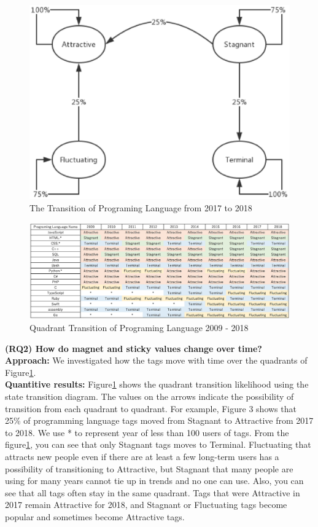 \documentclass[conference]{IEEEtran}
\begin{document}
\begin{figure}[t]
 \centering
 \includegraphics[width=.9\hsize]{img/Lang2017.eps}  
 \caption{The Transition of Programing Language from 2017 to 2018} 
 \label{fig:langtrans2018} 
\end{figure}

\begin{figure}[t]
 \centering
 \includegraphics[width=.9\hsize]{img/LanguageASFT.eps}  
 \caption{Quadrant Transition of Programing Language 2009 - 2018} 
 \label{fig:LangQuadrant} 
\end{figure}


\textbf{(RQ2) How do magnet and sticky values change over time?} \\
\smallskip\smallskip
\textbf{Approach:}
We investigated how the tags move with time over the quadrants of Figure\ref{fig:langtrans2018}. \\
\textbf{Quantitive results:}
Figure\ref{fig:langtrans2018} shows the quadrant transition likelihood using the state transition diagram. The values ​​on the arrows indicate the possibility of transition from each quadrant to quadrant. For example, Figure 3 shows that 25\% of programming language tags moved from Stagnant to Attractive from 2017 to 2018. We use * to represent year of less than 100 users of tags.
From the figure\ref{fig:langtrans2018}, you can see that only Stagnant tags moves to Terminal. Fluctuating that attracts new people even if there are at least a few long-term users has a possibility of transitioning to Attractive, but Stagnant that many people are using for many years cannot tie up in trends and no one can use. Also, you can see that all tags often stay in the same quadrant. Tags that were Attractive in 2017 remain Attractive for 2018, and Stagnant or Fluctuating tags become popular and sometimes become Attractive tags.
\smallskip\smallskip
\end{document}
